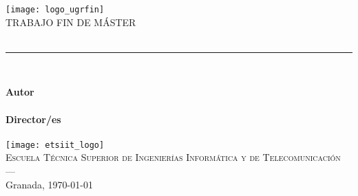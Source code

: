 \begin{titlepage}

\newlength{\centeroffset}
\setlength{\centeroffset}{-0.5\oddsidemargin}
\addtolength{\centeroffset}{0.5\evensidemargin}
\thispagestyle{empty}

\noindent\hspace*{\centeroffset}\begin{minipage}{\textwidth}

\centering
\texttt{[image: logo\_ugrfin]}\\[1.4cm]

\textsc{ \Large TRABAJO FIN DE MÁSTER\\[0.2cm]}
% 
{\Huge\bfseries \tituloTFM \\
}
\noindent\rule[-1ex]{\textwidth}{3pt}\\[3.5ex]
{\large\bfseries \subtituloTFM}
\end{minipage}

\vspace{0.5cm}
\noindent\hspace*{\centeroffset}\begin{minipage}{\textwidth}
\centering

\textbf{Autor}\\ {\estudiante}\\[2.5ex]
\textbf{Director/es}\\
{
    \ifthenelse{\equal{\tutorB}{}}{
      \tutorA
  }{
      \tutorA\\
      \tutorB
  }
}\\[2cm]

\texttt{[image: etsiit\_logo]}\\[0.1cm]
\textsc{Escuela Técnica Superior de Ingenierías Informática y de Telecomunicación}\\
\textsc{---}\\
Granada, \today
\end{minipage}
\end{titlepage}


